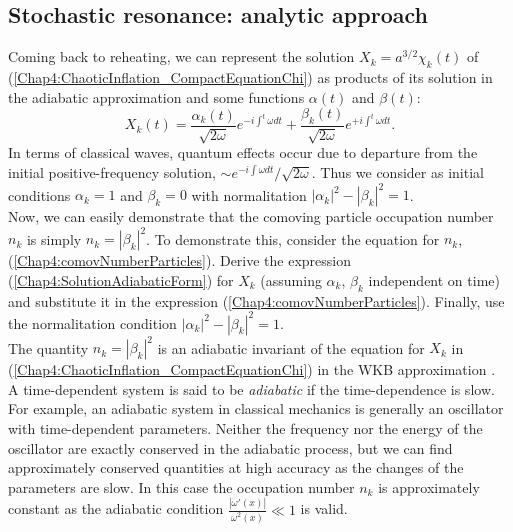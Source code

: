 \documentclass[11pt,a4paper,twoside]{book}
\begin{document}
\subsection{Stochastic resonance: analytic approach}
Coming back to reheating, we can represent the solution $ X_{k}=a^{3/2}\chi_{k}(t) $ of (\ref{Chap4:ChaoticInflation_CompactEquationChi}) as products of its solution in the adiabatic approximation and some functions $ \alpha (t) $ and $ \beta(t) $:
\begin{equation}
	\label{Chap4:SolutionAdiabaticForm}
	X_{k}(t) = \frac{\alpha_{k}(t)}{\sqrt{2\omega}}e^{-i\int^{t} \omega dt} 
	+ \frac{\beta_{k}(t)}{\sqrt{2\omega}}e^{+i\int^{t} \omega dt}.
\end{equation}
In terms of classical waves, quantum effects occur due to departure from the initial positive-frequency solution, $ \sim e^{-i \int \omega dt}/\sqrt{2\omega} $. Thus we consider as initial conditions $ \alpha_{k}=1 $ and $ \beta_{k}=0 $ with normalitation $ |\alpha_{k}|^{2} - |\beta_{k}|^{2} = 1 $.\\
Now, we can easily demonstrate that the comoving particle occupation number $ n_{k} $ is simply $ n_{k}=|\beta_{k}|^{2} $. To demonstrate this, consider the equation for $ n_{k} $, (\ref{Chap4:comovNumberParticles}). Derive the expression (\ref{Chap4:SolutionAdiabaticForm}) for $ X_{k} $ (assuming $ \alpha_{k} $, $\beta_{k}$ independent on time) and substitute it in the expression (\ref{Chap4:comovNumberParticles}). Finally, use the normalitation condition  $ |\alpha_{k}|^{2} - |\beta_{k}|^{2} = 1 $.\\
The quantity $ n_{k}=|\beta_{k}|^{2} $ is an adiabatic invariant of the equation for $ X_{k} $ in (\ref{Chap4:ChaoticInflation_CompactEquationChi}) in the WKB approximation .\\
A time-dependent system  is said to be \textit{adiabatic} if the time-dependence is slow. For example, an adiabatic system in classical mechanics is generally an oscillator with time-dependent parameters. Neither the frequency nor the energy of the oscillator are exactly conserved in the adiabatic process, but we can find approximately conserved quantities at high accuracy as the changes of the parameters are slow. In this case the occupation number $ n_{k} $ is approximately constant as the adiabatic condition $ \frac{|\omega'(x)|}{\omega^{2}(x)} \ll 1 $ is valid. \\
\end{document}
